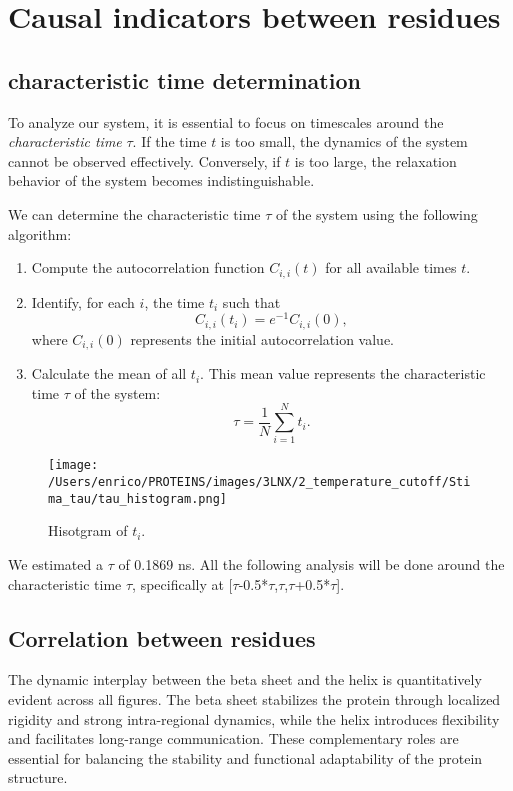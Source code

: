 \documentclass[English, Lau, oneside]{sapthesis}
\begin{document}
\newpage
\section{Causal indicators between residues}
\subsection{characteristic time determination}
To analyze our system, it is essential to focus on timescales around the \textit{characteristic time} \(\tau\). 
If the time \(t\) is too small, the dynamics of the system cannot be observed effectively. Conversely, if \(t\) is too large, the relaxation behavior of the system becomes indistinguishable.

We can determine the characteristic time \(\tau\) of the system using the following algorithm:
\begin{enumerate}
    \item Compute the autocorrelation function \(C_{i,i}(t)\) for all available times \(t\).
    \item Identify, for each \(i\), the time \(t_i\) such that 
    \[
    C_{i,i}(t_i) = e^{-1} C_{i,i}(0),
    \]
    where \(C_{i,i}(0)\) represents the initial autocorrelation value.
    \item Calculate the mean of all \(t_i\). This mean value represents the characteristic time \(\tau\) of the system:
    \[
    \tau = \frac{1}{N} \sum_{i=1}^{N} t_i.
    \]
\end{enumerate}

\begin{figure}[h!]
    \centering
    \texttt{[image: /Users/enrico/PROTEINS/images/3LNX/2\_temperature\_cutoff/Stima\_tau/tau\_histogram.png]}
    \caption{Hisotgram of \(t_i\).}
\end{figure}
We estimated a \(\tau\) of 0.1869 ns.
All the following analysis will be done around the characteristic time \(\tau\), specifically at [\(\tau\)-0.5*\(\tau\),\(\tau\),\(\tau\)+0.5*\(\tau\)].

\newpage



\subsection{Correlation between residues}
\noindent The dynamic interplay between the beta sheet and the helix is quantitatively evident across all figures. The beta sheet stabilizes the protein through localized rigidity and strong intra-regional dynamics, while the helix introduces flexibility and facilitates long-range communication. These complementary roles are essential for balancing the stability and functional adaptability of the protein structure.
\end{document}
